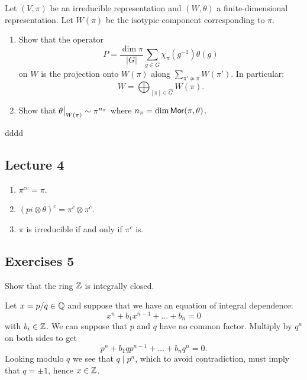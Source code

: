 \documentclass[11pt, english]{article}
\begin{document}
\begin{exc}
 Let $(V,\pi)$ be an irreducible representation and $(W,\theta)$ a finite-dimensional representation. Let $W(\pi)$ be the isotypic component corresponding to $\pi$.
 \begin{enumerate}
 \item Show that the operator
$$
P = \frac{\dim \pi}{\lvert G \rvert} \sum_{g \in G} \chi_\pi(g^{-1})\theta(g)
$$
on $W$ is the projection onto $W(\pi)$ along $\sum_{\pi' \not \simeq \pi} W(\pi')$. In particular:
$$
W = \bigoplus_{[\pi] \in \widehat G} W(\pi).
$$
\item Show that $\restr{\theta}{W(\pi)} \sim \pi^{n_\pi}$ where $n_\pi = \dim \mathsf{Mor}(\pi,\theta)$.
 \end{enumerate}
\end{exc}

\begin{sol}
dddd
\end{sol}


\subsection{Lecture 4}

\begin{exc}
  \begin{enumerate}
  \item $\pi^{cc}=\pi$.
\item $(pi \otimes \theta)^c = \pi^c \otimes \pi^c$.
\item $\pi$ is irreducible if and only if $\pi^c$ is.
  \end{enumerate}
\end{exc}

\subsection{Exercises 5}

\begin{exc}[Excercise 1]
Show that the ring $\mathbb{Z}$ is integrally closed.
\end{exc}
\begin{sol}
Let $x=p/q \in \mathbb{Q}$ and suppose that we have an equation of integral dependence:
$$
x^n + b_1x^{n-1} + \ldots + b_n = 0
$$
with $b_i \in \mathbb{Z}$. We can suppose that $p$ and $q$ have no common factor. Multiply by $q^n$ on both sides to get
$$
p^n+b_1qp^{n-1} + \ldots+b_nq^n = 0.
$$
Looking modulo $q$ we see that $q \mid p^n$, which to avoid contradiction, must imply that $q=\pm 1$, hence $x \in \mathbb{Z}$.
\end{sol}
\end{document}
